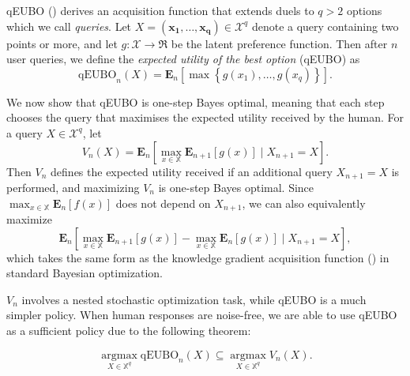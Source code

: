 \documentclass[
  letterpaper,
  DIV=11,
  numbers=noendperiod,
  oneside]{scrreprt}
\theoremstyle{remark}
\begin{document}
qEUBO
() derives an acquisition function that extends duels to
\(q>2\) options which we call \emph{queries}. Let
\(X=\left(\mathbf{x_1}, \ldots, \mathbf{x_q}\right) \in \mathcal{X}^q\)
denote a query containing two points or more, and let
\(g: \mathcal{X} \rightarrow \Re\) be the latent preference function.
Then after \(n\) user queries, we define the \emph{expected utility of
the best option} (qEUBO) as
\[\mathrm{qEUBO}_n(X)=\mathbf{E}_n\left[\max \left\{g\left(x_1\right), \ldots, g\left(x_q\right)\right\}\right].\]

We now show that qEUBO is one-step Bayes optimal, meaning that each step
chooses the query that maximises the expected utility received by the
human. For a query \(X \in \mathcal{X}^q\), let
\[V_n(X)=\mathbf{E}_n\left[\max _{x \in \mathbb{X}} \mathbf{E}_{n+1}[g(x)] \mid X_{n+1}=X\right] .\]
Then \(V_n\) defines the expected utility received if an additional
query \(X_{n+1}=X\) is performed, and maximizing \(V_n\) is one-step
Bayes optimal. Since \(\max _{x \in \mathbb{X}} \mathbf{E}_n[f(x)]\)
does not depend on \(X_{n+1}\), we can also equivalently maximize
\[\mathbf{E}_n\left[\max _{x \in \mathbb{X}} \mathbf{E}_{n+1}[g(x)]-\max _{x \in \mathbb{X}} \mathbf{E}_n[g(x)] \mid X_{n+1}=X\right],\]
which takes the same form as the knowledge gradient acquisition function
() in standard Bayesian optimization.

\(V_n\) involves a nested stochastic optimization task, while qEUBO is a
much simpler policy. When human responses are noise-free, we are able to
use qEUBO as a sufficient policy due to the following theorem:

\[\underset{X \in \mathbb{X}^q}{\operatorname{argmax}} \mathrm{qEUBO}_n(X) \subseteq \underset{X \in \mathbb{X}^q}{\operatorname{argmax}} V_n(X) .\]
\end{document}
